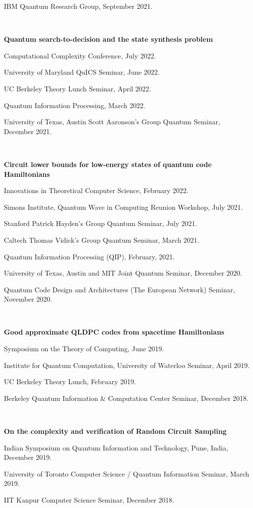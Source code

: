 \documentclass[11pt]{article}
\begin{document}
IBM Quantum Research Group, September 2021.

\

\textbf{Quantum search-to-decision and the state synthesis problem}

Computational Complexity Conference, July 2022.

University of Maryland QuICS Seminar, June 2022.

UC Berkeley Theory Lunch Seminar, April 2022.

Quantum Information Processing, March 2022.

University of Texas, Austin Scott Aaronson's Group Quantum Seminar, December 2021.

\

\textbf{Circuit lower bounds for low-energy states of quantum code Hamiltonians}

Innovations in Theoretical Computer Science, February 2022.

Simons Institute, Quantum Wave in Computing Reunion Workshop, July 2021.

Stanford Patrick Hayden's Group Quantum Seminar, July 2021.

Caltech Thomas Vidick's Group Quantum Seminar, March 2021.

Quantum Information Processing (QIP), February, 2021.

University of Texas, Austin and MIT Joint Quantum Seminar, December 2020. 

Quantum Code Design and Architectures (The European Network) Seminar, November 2020.

\

\textbf{Good approximate QLDPC codes from spacetime Hamiltonians}

Symposium on the Theory of Computing, June 2019.

Institute for Quantum Computation, University of Waterloo Seminar, April 2019.

UC Berkeley Theory Lunch, February 2019.

Berkeley Quantum Information \& Computation Center Seminar, December 2018.

\

\textbf{On the complexity and verification of Random Circuit Sampling}

Indian Symposium on Quantum Information and Technology, Pune, India, December 2019.

University of Toronto Computer Science / Quantum Information Seminar, March 2019.

IIT Kanpur Computer Science Seminar, December 2018.
\end{document}
